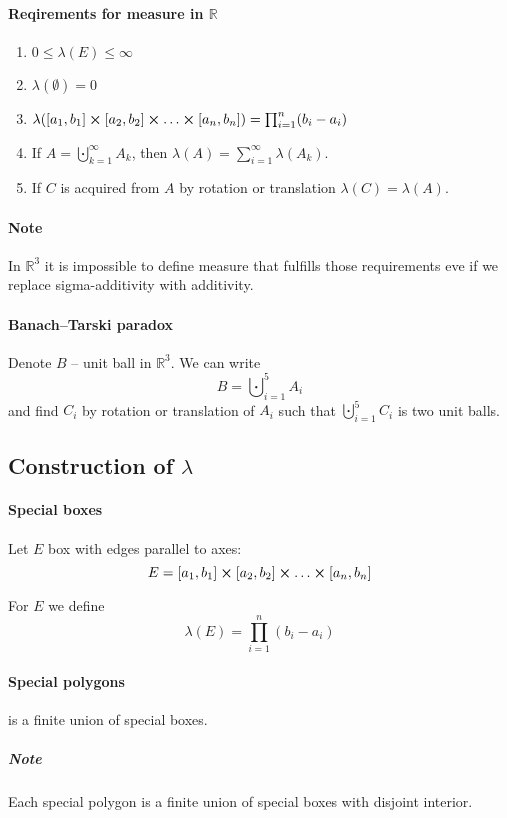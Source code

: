 \paragraph{Reqirements for measure in $\mathbb{R}$}

\begin{enumerate}
	\item $0\leq \lambda(E) \leq \infty$
	\item $\lambda(\emptyset) = 0$
	\item $\lambda(\qty[a_1,b_1]\cross\qty[a_2,b_2]\cross\dots\cross \qty[a_n,b_n]) = \prod_{i=1}^n (b_i-a_i)$
	\item If $A = \bigcupdot_{k=1}^\infty A_k$, then $\lambda(A) = \sum_{i=1}^\infty \lambda(A_k)$.
	\item If $C$ is acquired from $A$ by rotation or translation $\lambda(C) = \lambda(A)$.
\end{enumerate}
\paragraph{Note} In $\mathbb{R}^3$ it is impossible to define measure that fulfills those requirements eve if we replace sigma-additivity with additivity.
\paragraph{Banach–Tarski paradox} Denote $B$ -- unit ball in $\mathbb{R}^3$. We can write 
$$B = \bigcupdot_{i=1}^5 A_i$$
and find $C_i$ by rotation or translation of $A_i$ such that $\bigcupdot_{i=1}^5 C_i$ is two unit balls.

\begin{center}
	
\end{center}
\subsection{Construction of $\lambda$}
\paragraph{Special boxes} 
Let $E$ box with edges parallel to axes:
$$E = \qty[a_1,b_1]\cross\qty[a_2,b_2]\cross\dots\cross \qty[a_n,b_n]$$

For $E$ we define 
 $$\lambda(E) = \prod_{i=1}^n (b_i-a_i)$$
 
 \paragraph{Special polygons} is a finite union of special boxes. 
 \subparagraph{Note} Each special polygon is a finite union of special boxes with disjoint interior.
 
